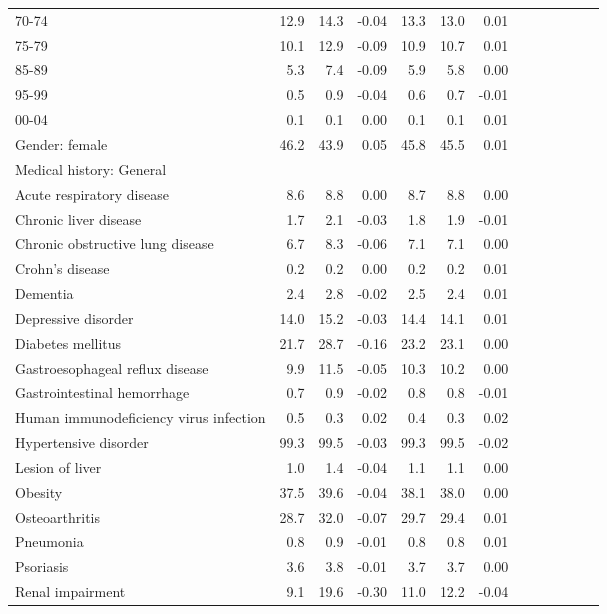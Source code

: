 \documentclass[11pt,]{article}
\begin{document}
\begin{longtable}{lrrrrrrrrrrrr}
      70-74 & 12.9 &  14.3 & -0.04 & 13.3 &  13.0 &  0.01 \\ 
      75-79 & 10.1 &  12.9 & -0.09 & 10.9 &  10.7 &  0.01 \\ 
      85-89 &  5.3 &   7.4 & -0.09 &  5.9 &   5.8 &  0.00 \\ 
      95-99 &  0.5 &   0.9 & -0.04 &  0.6 &   0.7 & -0.01 \\ 
      00-04 &  0.1 &   0.1 &  0.00 &  0.1 &   0.1 &  0.01 \\ 
  Gender: female & 46.2 &  43.9 &  0.05 & 45.8 &  45.5 &  0.01 \\ 
  Medical history: General &    &     &     &    &     &     \\ 
      Acute respiratory disease &  8.6 &   8.8 &  0.00 &  8.7 &   8.8 &  0.00 \\ 
      Chronic liver disease &  1.7 &   2.1 & -0.03 &  1.8 &   1.9 & -0.01 \\ 
      Chronic obstructive lung disease &  6.7 &   8.3 & -0.06 &  7.1 &   7.1 &  0.00 \\ 
      Crohn's disease &  0.2 &   0.2 &  0.00 &  0.2 &   0.2 &  0.01 \\ 
      Dementia &  2.4 &   2.8 & -0.02 &  2.5 &   2.4 &  0.01 \\ 
      Depressive disorder & 14.0 &  15.2 & -0.03 & 14.4 &  14.1 &  0.01 \\ 
      Diabetes mellitus & 21.7 &  28.7 & -0.16 & 23.2 &  23.1 &  0.00 \\ 
      Gastroesophageal reflux disease &  9.9 &  11.5 & -0.05 & 10.3 &  10.2 &  0.00 \\ 
      Gastrointestinal hemorrhage &  0.7 &   0.9 & -0.02 &  0.8 &   0.8 & -0.01 \\ 
      Human immunodeficiency virus infection &  0.5 &   0.3 &  0.02 &  0.4 &   0.3 &  0.02 \\ 
      Hypertensive disorder & 99.3 &  99.5 & -0.03 & 99.3 &  99.5 & -0.02 \\ 
      Lesion of liver &  1.0 &   1.4 & -0.04 &  1.1 &   1.1 &  0.00 \\ 
      Obesity & 37.5 &  39.6 & -0.04 & 38.1 &  38.0 &  0.00 \\ 
      Osteoarthritis & 28.7 &  32.0 & -0.07 & 29.7 &  29.4 &  0.01 \\ 
      Pneumonia &  0.8 &   0.9 & -0.01 &  0.8 &   0.8 &  0.01 \\ 
      Psoriasis &  3.6 &   3.8 & -0.01 &  3.7 &   3.7 &  0.00 \\ 
      Renal impairment &  9.1 &  19.6 & -0.30 & 11.0 &  12.2 & -0.04 \\ 

\end{longtable}
\end{document}
